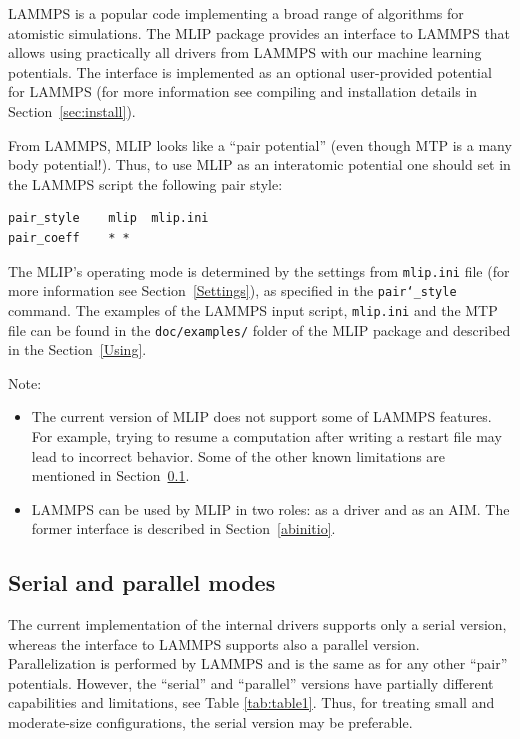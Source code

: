 \documentclass[12pt]{article}
\renewcommand{\_}{\char`_}
\begin{document}
LAMMPS is a popular code implementing a broad range of algorithms for atomistic simulations.
The MLIP package provides an interface to LAMMPS that allows using practically all drivers from LAMMPS with our machine learning potentials. 
The interface is implemented as an optional user-provided potential for LAMMPS (for more information see compiling and installation details in Section~\ref{sec:install}). 

From LAMMPS, MLIP looks like a ``pair potential'' (even though MTP is a many body potential!). Thus, to use MLIP as an interatomic potential one should set in the LAMMPS script the following pair style:
\begin{verbatim}
pair_style    mlip  mlip.ini
pair_coeff    * *
\end{verbatim}
The MLIP's operating mode is determined by the settings from \texttt{mlip.ini} file (for more information see Section~\ref{Settings}), as specified in the \texttt{pair\_style} command. The examples of the LAMMPS input script, \texttt{mlip.ini} and the MTP file can be found in the \texttt{doc/examples/} folder of the MLIP package and described in the Section~\ref{Using}.

Note: 
\begin{itemize}
	\item The current version of MLIP does not support some of LAMMPS features. For example, trying to resume a computation after writing a restart file may lead to incorrect behavior. Some of the other known limitations are mentioned in Section~\ref{serpar}.
	\item LAMMPS can be used by MLIP in two roles: as a driver and as an AIM. The former interface is described in Section~\ref{abinitio}.
\end{itemize}


\subsection{Serial and parallel modes}\label{serpar}

The current implementation of the internal drivers supports only a serial version, whereas the interface to LAMMPS supports also a parallel version. Parallelization is performed by LAMMPS and is the same as for any other ``pair'' potentials. However, the ``serial'' and ``parallel'' versions have partially different capabilities and limitations, see Table \ref{tab:table1}.
Thus, for treating small and moderate-size configurations, the serial version may be preferable.
\end{document}
